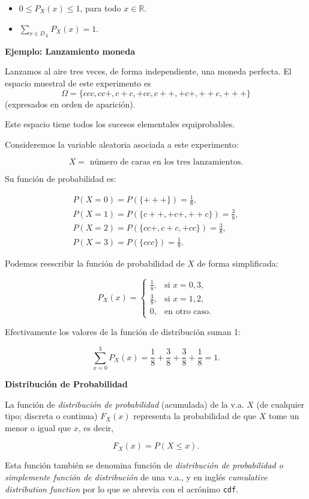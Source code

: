 \documentclass[
  letterpaper,
  DIV=11,
  numbers=noendperiod]{scrreprt}
\providecommand{\tightlist}{%
  \setlength{\itemsep}{0pt}\setlength{\parskip}{0pt}}\usepackage{longtable,booktabs,array}
\begin{document}
\begin{itemize}
\tightlist
\item
  \(0\leq P_{X}(x)\leq 1\), para todo \(x\in\mathbb{R}\).
\item
  \(\sum\limits_{x\in D_X} P_{X}(x)=1\).
\end{itemize}

\textbf{Ejemplo: Lanzamiento moneda}

Lanzamos al aire tres veces, de forma independiente, una moneda
perfecta. El espacio muestral de este experimento es
\[\Omega=\{ccc,cc+,c+c,+cc,c++,+c+,++c,+++\}\] (expresados en orden de
aparición).

Este espacio tiene todos los sucesos elementales equiprobables.

Consideremos la variable aleatoria asociada a este experimento:

\[X=\mbox{ número de caras en los tres lanzamientos}.\]

Su función de probabilidad es:

\[
\begin{array}{l}
P(X=0)=P(\{+++\})=\frac18,\\ P(X=1)=P(\{c++,+c+,++c\})=\frac38,\\
    P(X=2)=P(\{cc+,c+c,+cc\})=\frac38,\\
    P(X=3)=P(\{ccc\})=\frac18.
\end{array}
\]

Podemos reescribir la función de probabilidad de \(X\) de forma
simplificada:

\[P_{X}(x)=\left\{\begin{array}{ll} \frac18, & \mbox{si } x=0, 3,\\[1ex]
\frac38, & \mbox{si } x=1,2,\\[1ex] 0, & \mbox{en otro caso.}\end{array}\right.\]

Efectivamente los valores de la función de distribución suman 1:

\[\sum_{x=0}^3 P_X(x)= \frac18+\frac38+\frac38+\frac18=1.\]

\textbf{Distribución de Probabilidad}

La función de \emph{distribución de probabilidad} (acumulada) de la v.a.
\(X\) (de cualquier tipo; discreta o continua) \(F_{X}(x)\) representa
la probabilidad de que \(X\) tome un menor o igual que \(x\), es decir,

\[F_{X}(x)=P(X\leq x).\]

Esta función también se denomina función de \emph{distribución de
probabilidad o simplemente función de distribución} de una v.a., y en
inglés \emph{cumulative distribution function} por lo que se abrevia con
el acrónimo \texttt{cdf}.
\end{document}

